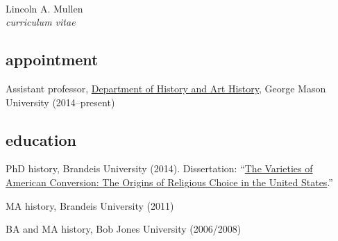 \documentclass[11pt]{article}
\begin{document}
\thispagestyle{fancy}
\fancyfoot{}
\fancyhead{}
\renewcommand{\headrulewidth}{0pt}

\hfill\hfill\hfill
\hfill\hfill\hfill
\hfill\hfill\hfill
\hfill\hfill\hfill
\begin{minipage}[t]{1.4in}
   \\
\end{minipage}
\hfill
\begin{minipage}[t]{1.9in}
\end{minipage}

\vspace{0.5in}

{\Large Lincoln A. Mullen}\\
\emph{curriculum vitae}\\[0.5cm]

\vspace{0.05in}

\subsection{appointment}\label{appointment}

Assistant professor, \href{http://historyarthistory.gmu.edu/}{Department
of History and Art History}, George Mason University (2014--present)

\subsection{education}\label{education}

PhD history, Brandeis University (2014). Dissertation:
``\href{/research/\#dissertation}{The Varieties of American Conversion:
The Origins of Religious Choice in the United States}.''

MA history, Brandeis University (2011)

BA and MA history, Bob Jones University (2006/2008)
\end{document}
